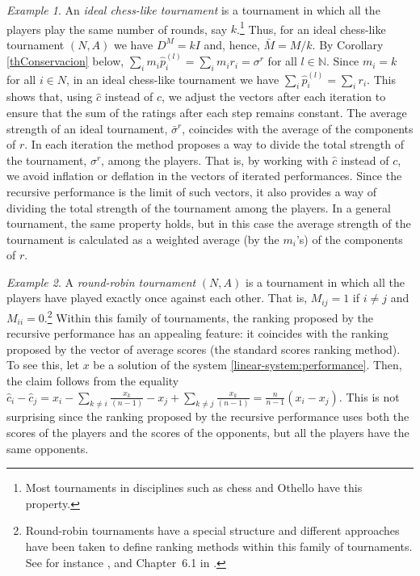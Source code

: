 \documentclass[a4paper,10pt]{article}
\theoremstyle{remark}
\newtheorem{example}{Example}
\newcommand{\TM}{A} %
\newcommand{\MM}{M} %
\newcommand{\DM}{D^\MM} %
\newcommand{\TS}{\sigma^\rv} %
\newcommand{\AS}{\bar \sigma^\rv} %
\newcommand{\rv}{r} %
\newcommand{\pv}{p} %
\begin{document}
\begin{example}
An \emph{ideal chess-like tournament} is a tournament in which all
the players play the same number of rounds, say $k$.\footnote{Most
tournaments in disciplines such as chess and Othello have this
property.} Thus, for an ideal chess-like
tournament $(N,\TM)$ we have $\DM=kI$ and, hence,
$\bar{\MM}=\MM/k$.  By Corollary \ref{thConservacion} below, $\sum_{i}m_i
\hat{\pv}_i^{(l)}=\sum_{i} m_i \rv_i=\TS$  for all $l\in \mathbb N$.
Since $m_i=k$ for all $i\in N$, in an ideal chess-like tournament we have $\sum_{i}
\hat \pv^{(l)}_i=\sum_{i} r_i$. This shows that, using $\hat{c}$
instead of $c$, we adjust the vectors after each iteration to
ensure that the sum of the ratings after each step remains
constant. The average strength of an ideal tournament, $\AS$,
coincides with the average of the components of $\rv$. In each
iteration the method proposes a way to divide the total strength
of the tournament, $\TS$, among the players. That is, by working
with $\hat{c}$ instead of $c$, we avoid inflation or deflation in
the vectors of iterated performances. Since the recursive
performance is the limit of such vectors, it also provides a way
of dividing the total strength of the tournament among the
players. In a general tournament, the same property holds, but in
this case the average strength of the tournament is calculated as
a weighted average (by the $m_i$'s) of the components of $\rv$.
\end{example}

\begin{example}
A \emph{round-robin tournament} $(N,\TM)$ is a tournament in which
all the players have played exactly once against each other. That is, $\MM_{ij}=1$ if $i\neq j$ and
${\MM}_{ii}=0$.\footnote{Round-robin tournaments have a special
structure and different approaches have been taken to define
ranking methods within this family of tournaments. See for
instance \cite{Daniels:1969}, \cite{Stob:1985} and Chapter~6.1 in
\cite{David:1988}.} Within this family of tournaments, the ranking proposed by the recursive
performance has an appealing feature: it coincides with the ranking
proposed by the vector of average scores (the standard scores ranking method). To see this, let $x$ be a solution of
the system \eqref{linear-system:performance}. Then, the claim follows from
the equality $\hat{c}_i-\hat{c}_j=x_i-\sum_{k\neq
i}\frac{x_k}{(n-1)}-x_j+\sum_{k\neq
j}\frac{x_k}{(n-1)}=\frac{n}{n-1}(x_i-x_j)$. This is not
surprising since the ranking proposed by the recursive performance
uses both the scores of the players and the scores of the
opponents, but all the players have the same
opponents. 
\end{example}
\end{document}
